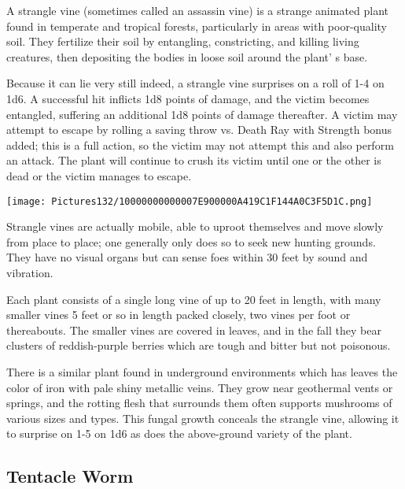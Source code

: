 \documentclass[a4paper,twoside,openany,10pt]{book}
\begin{document}
\begin{multicols}{2}
A strangle vine (sometimes called an assassin vine) is a strange animated plant found in temperate and tropical forests, particularly in areas with poor-quality soil. They fertilize their soil by entangling, constricting, and killing living creatures, then depositing the bodies in loose soil around the plant' s base.

Because it can lie very still indeed, a strangle vine surprises on a roll of 1-4 on 1d6. A successful hit inflicts 1d8 points of damage, and the victim becomes entangled, suffering an additional 1d8 points of damage thereafter. A victim may attempt to escape by rolling a saving throw vs. Death Ray with Strength bonus added; this is a full action, so the victim may not attempt this and also perform an attack. The plant will continue to crush its victim until one or the other is dead or the victim manages to escape.


\begin{center} \texttt{[image: Pictures132/10000000000007E900000A419C1F144A0C3F5D1C.png]} \end{center}

Strangle vines are actually mobile, able to uproot themselves and move slowly from place to place; one generally only does so to seek new hunting grounds. They have no visual organs but can sense foes within 30 feet by sound and vibration.

Each plant consists of a single long vine of up to 20 feet in length, with many smaller vines 5 feet or so in length packed closely, two vines per foot or thereabouts. The smaller vines are covered in leaves, and in the fall they bear clusters of reddish-purple berries which are tough and bitter but not poisonous.

There is a similar plant found in underground environments which has leaves the color of iron with pale shiny metallic veins. They grow near geothermal vents or springs, and the rotting flesh that surrounds them often supports mushrooms of various sizes and types. This fungal growth conceals the strangle vine, allowing it to surprise on 1-5 on 1d6 as does the above-ground variety of the plant.

\subsection*{Tentacle Worm}\label{tentacle-worm}


\end{multicols}
\end{document}
